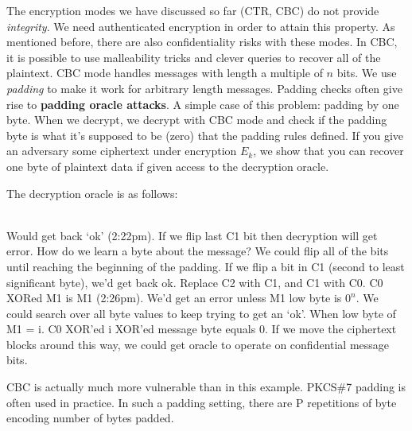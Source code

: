 The encryption modes we have discussed so far (CTR, CBC) do not provide \emph{integrity}. We need authenticated encryption in order to attain this property. 
As mentioned before, there are also confidentiality risks with these modes. In CBC, it is possible to use malleability tricks and clever queries to recover all of the plaintext. 
CBC mode handles messages with length a multiple of $n$ bits. We use \emph{padding} to make it work for arbitrary length messages. Padding checks often give rise to {\bf padding oracle attacks}.
A simple case of this problem: padding by one byte. When we decrypt, we decrypt with CBC mode and check if the padding byte is what it's supposed to be (zero) that the padding rules defined. If you give an adversary some ciphertext under encryption $E_k$, we show that you can recover one byte of plaintext data if given access to the decryption oracle. 

The decryption oracle is as follows:

\vspace{0.2cm}\\

Would get back `ok' (2:22pm). If we flip last C1 bit then decryption will get error. How do we learn a byte about the message? We could flip all of the bits until reaching the beginning of the padding.
If we flip a bit in C1 (second to least significant byte), we'd get back ok. Replace C2 with C1, and C1 with C0. C0 XORed M1 is M1 (2:26pm). We'd get an error unless M1 low byte is $0^n$. We could search over all byte values to keep trying to get an `ok'. When low byte of M1 = i. C0 XOR'ed i XOR'ed message byte equals 0. If we move the ciphertext blocks around this way, we could get oracle to operate on confidential message bits.

CBC is actually much more vulnerable than in this example. PKCS\#7 padding is often used in practice. In such a padding setting, there are P repetitions of byte encoding number of bytes padded. 

\vspace{0.2cm}\\

